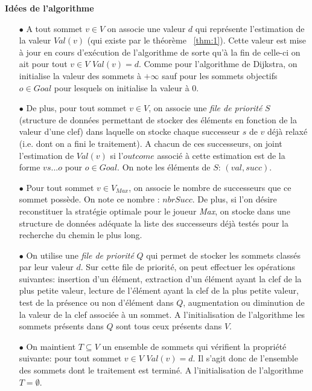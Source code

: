 \noindent \textbf{Idées de l'algorithme}\\

\begin{enumerate}
	
	\item[$\bullet$] A tout sommet $v \in V$ on associe une valeur $d$ qui représente l'estimation de la valeur $Val(v)$ (qui existe par le théorème ~\ref{thm:1}). Cette valeur est mise à jour en cours d'exécution de l'algorithme de sorte qu'à la fin de celle-ci on ait pour tout $v \in V$ $Val(v) = d$. Comme pour l'algorithme de Dijkstra, on initialise la valeur des sommets à $+\infty$ sauf pour les sommets objectifs $o \in Goal$ pour lesquels on initialise la valeur à 0.
	
	\item[$\bullet$] De plus, pour tout sommet $v \in V$, on associe une \textit{file de priorité} $S$ (structure de données permettant de stocker des éléments en fonction de la valeur d'une clef) dans laquelle on stocke chaque successeur $s$ de $v$ déjà relaxé (i.e. dont on a fini le traitement). A chacun de ces successeurs, on joint l'estimation de  $Val(v)$ si l'$outcome$ associé à cette estimation est de la forme $v s ... o$ pour $o \in Goal$. On note les éléments de $S$: $(val,succ)$.
	
	\item[$\bullet$] Pour tout sommet $v \in V_{Max}$, on associe le nombre de successeurs que ce sommet possède. On note ce nombre : $nbrSucc$. De plus, si l'on désire reconstituer la stratégie optimale pour le joueur \textit{Max}, on stocke dans une structure de données adéquate la liste des successeurs déjà testés pour la recherche du chemin le plus long.
	
		\item[$\bullet$] On utilise une \textit{file de priorité} $Q$ qui permet de stocker les sommets classés par leur valeur $d$. Sur cette file de priorité, on peut effectuer les opérations suivantes: insertion d'un élément, extraction d'un élément ayant la clef de la plus petite valeur, lecture de l'élément ayant la clef de la plus petite valeur, test de la présence ou non d'élément dans $Q$, augmentation ou diminution de la valeur de la clef associée à un sommet. A l'initialisation de l'algorithme les sommets présents dans $Q$ sont tous ceux présents dans $V$.
	
	\item[$\bullet$] On maintient $T \subseteq V$ un ensemble de sommets qui vérifient la propriété suivante: pour tout sommet $v \in V$ $Val(v) = d$. Il s'agit donc de l'ensemble des sommets dont le traitement est terminé. A l'initialisation de l'algorithme $T = \emptyset$.
	

\end{enumerate}
